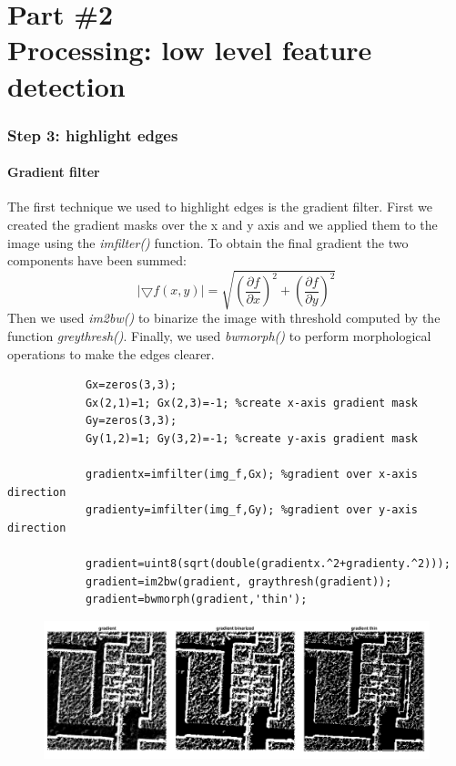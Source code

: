 \documentclass[12pt,a4paper,oneside,final,titlepage,openany,onecolumn]{article}
\begin{document}
	\section*{{\small Part \#2} \\ Processing: low level feature detection}
		\subsubsection*{Step 3: highlight edges}
		\paragraph{Gradient filter\\}
		The first technique we used to highlight edges is the gradient filter.
		\newline
		First we created the gradient masks over the x and y axis and we applied them to the image using the \textit{imfilter()} function. To obtain the final gradient the two components have been summed:
		\[\left\vert\bigtriangledown f(x, y)\right\vert = \sqrt{\left(\dfrac{\partial f}{\partial x}\right)^2 + \left(\dfrac{\partial f}{\partial y}\right)^2} \]
		Then we used \textit{im2bw()} to binarize the image with threshold computed by the function \textit{greythresh()}. Finally, we used \textit{bwmorph()} to perform morphological operations to make the edges clearer.
		\begin{lstlisting}			
			Gx=zeros(3,3);
			Gx(2,1)=1; Gx(2,3)=-1; %create x-axis gradient mask
			Gy=zeros(3,3);
			Gy(1,2)=1; Gy(3,2)=-1; %create y-axis gradient mask
			
			gradientx=imfilter(img_f,Gx); %gradient over x-axis direction
			gradienty=imfilter(img_f,Gy); %gradient over y-axis direction
			
			gradient=uint8(sqrt(double(gradientx.^2+gradienty.^2)));
			gradient=im2bw(gradient, graythresh(gradient));
			gradient=bwmorph(gradient,'thin');
		\end{lstlisting}
		\begin{figure}[h!]
			\includegraphics[width=\linewidth]{images/gradient.png}
		\end{figure}
		
\end{document}

